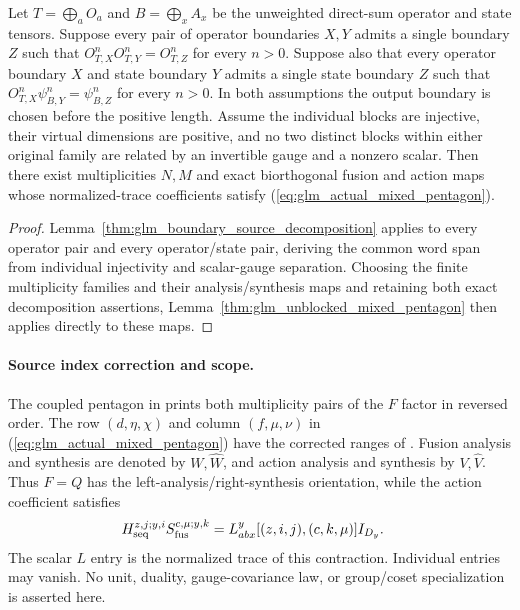 \begin{lemma}
    \leanok
    \label{thm:glm_boundary_source_mixed_pentagon}
    Let $T=\bigoplus_aO_a$ and $B=\bigoplus_xA_x$ be the unweighted
    direct-sum operator and state tensors. Suppose every pair of operator
    boundaries $X,Y$ admits a single boundary $Z$ such that
    $O^n_{T,X}O^n_{T,Y}=O^n_{T,Z}$ for every $n>0$. Suppose also that
    every operator boundary $X$ and state boundary $Y$ admits a single
    state boundary $Z$ such that $O^n_{T,X}\psi^n_{B,Y}=\psi^n_{B,Z}$
    for every $n>0$. In both assumptions the output boundary is chosen
    before the positive length.
    Assume the individual blocks are injective, their virtual dimensions
    are positive, and no two distinct blocks within either original
    family are related by an invertible gauge and a nonzero scalar.
    Then there exist multiplicities $N,M$ and exact biorthogonal fusion
    and action maps whose normalized-trace coefficients satisfy
    (\ref{eq:glm_actual_mixed_pentagon}).
\end{lemma}
\begin{proof}
    \leanok
    Lemma~\ref{thm:glm_boundary_source_decomposition} applies to every
    operator pair and every operator/state pair, deriving the common word
    span from individual injectivity and scalar-gauge separation. Choosing
    the finite multiplicity families and their analysis/synthesis maps and
    retaining both exact decomposition assertions,
    Lemma~\ref{thm:glm_unblocked_mixed_pentagon} then applies directly to
    these maps.
\end{proof}

\paragraph{Source index correction and scope.}
The coupled pentagon in \cite[Section~3]{GarreRubio2023MPOSym}
prints both multiplicity pairs of the $F$ factor in reversed order.
The row $(d,\eta,\chi)$ and column $(f,\mu,\nu)$ in
(\ref{eq:glm_actual_mixed_pentagon}) have the corrected ranges of
\cite{gap:glm23_multiplicity_l_indices}. Fusion analysis and synthesis
are denoted by $W,\widehat W$, and action analysis and synthesis by
$V,\widehat V$. Thus $F=Q$ has the left-analysis/right-synthesis
orientation, while the action coefficient satisfies
\begin{align}
    H_{\rm seq}^{z,j;y,i}S_{\rm fus}^{c,\mu;y,k}
     & =L_{abx}^{y}[(z,i,j),(c,k,\mu)]I_{D_y}.\notag
\end{align}
The scalar $L$ entry is the normalized trace of this contraction.
Individual entries may vanish. No unit, duality, gauge-covariance law,
or group/coset specialization is asserted here.

